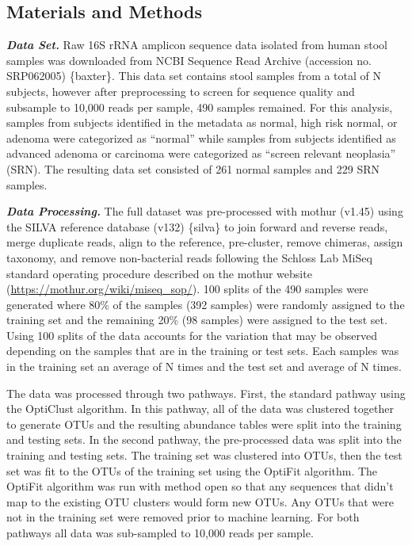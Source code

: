 \documentclass[
  11pt,
]{article}
\begin{document}
\hypertarget{materials-and-methods}{%
\subsection{Materials and Methods}\label{materials-and-methods}}

\textbf{\emph{Data Set.}} Raw 16S rRNA amplicon sequence data isolated
from human stool samples was downloaded from NCBI Sequence Read Archive
(accession no. SRP062005) \{baxter\}. This data set contains stool
samples from a total of N subjects, however after preprocessing to
screen for sequence quality and subsample to 10,000 reads per sample,
490 samples remained. For this analysis, samples from subjects
identified in the metadata as normal, high risk normal, or adenoma were
categorized as ``normal'' while samples from subjects identified as
advanced adenoma or carcinoma were categorized as ``screen relevant
neoplasia'' (SRN). The resulting data set consisted of 261 normal
samples and 229 SRN samples.

\textbf{\emph{Data Processing.}} The full dataset was pre-processed with
mothur (v1.45) using the SILVA reference database (v132) \{silva\} to
join forward and reverse reads, merge duplicate reads, align to the
reference, pre-cluster, remove chimeras, assign taxonomy, and remove
non-bacterial reads following the Schloss Lab MiSeq standard operating
procedure described on the mothur website
(\url{https://mothur.org/wiki/miseq_sop/}). 100 splits of the 490
samples were generated where 80\% of the samples (392 samples) were
randomly assigned to the training set and the remaining 20\% (98
samples) were assigned to the test set. Using 100 splits of the data
accounts for the variation that may be observed depending on the samples
that are in the training or test sets. Each samples was in the training
set an average of N times and the test set and average of N times.

The data was processed through two pathways. First, the standard pathway
using the OptiClust algorithm. In this pathway, all of the data was
clustered together to generate OTUs and the resulting abundance tables
were split into the training and testing sets. In the second pathway,
the pre-processed data was split into the training and testing sets. The
training set was clustered into OTUs, then the test set was fit to the
OTUs of the training set using the OptiFit algorithm. The OptiFit
algorithm was run with method open so that any sequences that didn't map
to the existing OTU clusters would form new OTUs. Any OTUs that were not
in the training set were removed prior to machine learning. For both
pathways all data was sub-sampled to 10,000 reads per sample.
\end{document}
